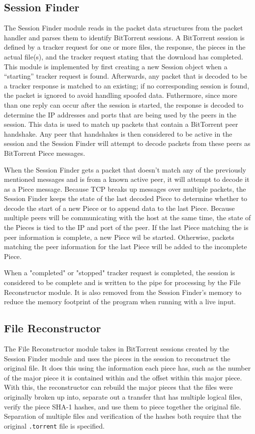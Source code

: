 \documentclass{acm_proc_article-sp}
\begin{document}
\subsection{Session Finder}
The Session Finder module reads in the packet data structures from the packet
handler and parses them to identify BitTorrent sessions. A BitTorrent session is
defined by a tracker request for one or more files, the response, the pieces in
the actual file(s), and the tracker request stating that the download has
completed. This module is implemented by first creating a new Session object
when a ``starting'' tracker request is found. Afterwards, any packet that is
decoded to be a tracker response is matched to an existing; if no corresponding
session is found, the packet is ignored to avoid handling spoofed data.
Futhermore, since more than one reply can occur after the session is started,
the response is decoded to determine the IP addresses and ports that are being
used by the peers in the session. This data is used to match up packets that
contain a BitTorrent peer handshake. Any peer that handshakes is then considered
to be active in the session and the Session Finder will attempt to decode
packets from these peers as BitTorrent Piece messages.

When the Session Finder gets a packet that doesn't match any of the previously
mentioned messages and is from a known active peer, it will attempt to decode it
as a Piece message. Because TCP breaks up messages over multiple packets, the
Session Finder keeps the state of the last decoded Piece to determine whether to
decode the start of a new Piece or to append data to the last Piece. Because 
multiple peers will be communicating with the host at the same time, the state 
of the Pieces is tied to the IP and port of the peer. If the last Piece matching
the is peer information is complete, a new Piece wil be started. Otherwise, 
packets matching the peer information for the last Piece will be added to the 
incomplete Piece.

When a "completed" or "stopped" tracker request is completed, the session is
considered to be complete and is written to the pipe for processing by the File
Reconstructor module. It is also removed from the Session Finder's memory to
reduce the memory footprint of the program when running with a live input.


\subsection{File Reconstructor}
The File Reconstructor module takes in BitTorrent sessions created by the
Session Finder module and uses the pieces in the session to reconstruct the
original file. It does this using the information each piece has, such as the
number of the major piece it is contained within and the offset within this
major piece. With this, the reconstructor can rebuild the major pieces that the
files were originally broken up into, separate out a transfer that has multiple
logical files, verify the piece SHA-1 hashes, and use them to piece together
the original file. Separation of multiple files and verification of the hashes
both require that the original \texttt{.torrent} file is specified.
\end{document}

